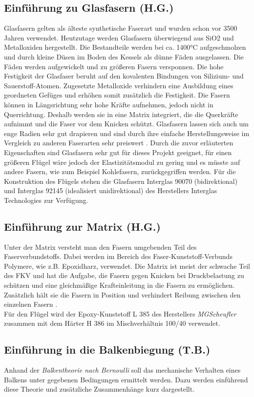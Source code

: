 \subsection{Einführung zu Glasfasern (H.G.)}
\label{Glasfaser}
Glasfasern gelten als älteste synthetische Faserart und wurden schon vor 3500 Jahren verwendet. Heutzutage werden Glasfasern überwiegend aus SiO2 und Metalloxiden hergestellt. Die Bestandteile werden bei ca. 1400°C aufgeschmolzen und durch kleine Düsen im Boden des Kessels als dünne Fäden ausgelassen. Die Fäden werden aufgewickelt und zu größeren Fasern versponnen\cite{item3}.
Die hohe Festigkeit der Glasfaser beruht auf den kovalenten Bindungen von Silizium- und Sauerstoff-Atomen. Zugesetzte Metalloxide verhindern eine Ausbildung eines geordneten Gefüges und erhöhen somit zusätzlich die Festigkeit. Die Fasern können in Längsrichtung sehr hohe Kräfte aufnehmen, jedoch nicht in Querrichtung. Deshalb werden sie in eine Matrix integriert, die die Querkräfte aufnimmt und die Faser vor dem Knicken schützt. Glasfasern lassen sich auch um enge Radien sehr gut drapieren und sind durch ihre einfache Herstellungsweise im Vergleich zu anderen Faserarten sehr preiswert \cite{item4}.
Durch die zuvor erläuterten Eigenschaften sind Glasfasern sehr gut für dieses Projekt geeignet, für einen größeren Flügel wäre jedoch der Elastizitätsmodul zu gering und es müsste auf andere Fasern, wie zum Beispiel Kohlefasern, zurückgegriffen werden. 
Für die Konstruktion des Flügels stehen die Glasfasern Interglas 90070 (bidirektional) und Interglas 92145 (idealisiert unidirektional) des Herstellers Interglas Technologies zur Verfügung. 
\parskip
\parskip
\subsection{Einführung zur Matrix (H.G.)}
Unter der Matrix versteht man den Fasern umgebenden Teil des Faserverbundstoffs. Dabei werden im Bereich des Faser-Kunststoff-Verbunds Polymere, wie z.B. Epoxidharz, verwendet. Die Matrix ist meist der schwache Teil des FKV und hat die Aufgabe, die Fasern gegen Knicken bei Druckbelastung zu schützen und eine gleichmäßige Krafteinleitung in die Fasern zu ermöglichen. Zusätzlich hält sie die Fasern in Position und verhindert Reibung zwischen den einzelnen Fasern \cite{item3}.\\
Für den Flügel wird der Epoxy-Kunststoff L 385 des Herstellers \textit{MGScheufler} zusammen mit dem Härter H 386 im Mischverhältnis 100/40 verwendet.
\newpage

\subsection{Einführung in die Balkenbiegung (T.B.)}\label{Balken}
Anhand der \textit{Balkentheorie nach Bernoulli} soll das mechanische Verhalten eines Balkens unter gegebenen Bedingungen ermittelt werden. Dazu werden einführend diese Theorie und zusätzliche Zusammenhänge kurz dargestellt.\\


